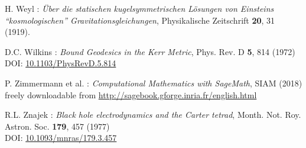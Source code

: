 \begin{thebibliography}{123}
H. Weyl : {\em \"Uber die statischen kugelsymmetrischen L\"osungen von Einsteins ``kosmologischen'' Gravitationsgleichungen},
Physikalische Zeitschrift {\bf 20}, 31 (1919).

D.C. Wilkins :
{\em Bound Geodesics in the Kerr Metric},
Phys. Rev. D {\bf 5}, 814 (1972)\\
DOI: \href{https://doi.org/10.1103/PhysRevD.5.814}{10.1103/PhysRevD.5.814}

P. Zimmermann et al. : {\em Computational Mathematics with SageMath}, SIAM (2018) \\
freely downloadable from \url{http://sagebook.gforge.inria.fr/english.html}

R.L. Znajek :
{\em Black hole electrodynamics and the Carter tetrad},
Month. Not. Roy. Astron. Soc. {\bf 179}, 457 (1977)\\
DOI: \href{https://doi.org/10.1093/mnras/179.3.457}{10.1093/mnras/179.3.457}

\end{thebibliography}

